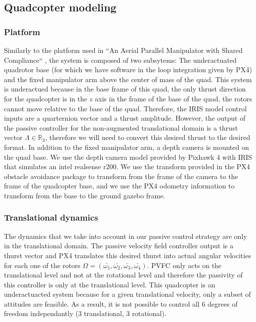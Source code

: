 \subsection{Quadcopter modeling}
\subsubsection{Platform}
Similarly to the platform used in ``An Aerial Parallel Manipulator with Shared Compliance`` \cite{Stephens2022}, the system is composed of two subsytems: The underactuated quadrotor base (for which we have software in the loop integration given by PX4) and the fixed manipulator arm above the center of mass of the quad.
This system is underactued because in the base frame of this quad, the only thrust direction for the quadcopter is in the $z$ axis in the frame of the base of the quad, the rotors cannot move relative to the base of the quad. Therefore, the IRIS model control inputs are a quarternion vector and a thrust amplitude. However, the output of the passive controller for the non-augmented translational domain is a thrust vector $\Lambda \in\mathbb R_3 $, therefore we will need to convert this desired thrust to the desired format.
In addition to the fixed manipulator arm, a depth camera is mounted on the quad base. We use the depth camera model provided by Pixhawk 4 with IRIS that simulates an intel realsense r200. We use the transform provided in the PX4 obstacle avoidance package to transform from the frame of the camera to the frame of the quadcopter base, and we use the PX4 odometry information to transform from the base to the ground gazebo frame.

\subsubsection{Translational dynamics}

The dynamics that we take into account in our passive control strategy are only in the translational domain. The passive velocity field controller output is a thurst vector and PX4 translates this desired thurst into actual angular velocities for each one of the rotors 
$\Omega = (\bar{\omega_1}, \bar{\omega_2}, \bar{\omega_3}, \bar{\omega_4})$. PVFC only acts on the translational level and not at the rotational level and therefore the passivity of this controller is only at the translational level. 
This quadcopter is an underactuacted system because for a given translational velocity, only a subset of attitudes are feasible. As a result, it is not possible to control all 6 degrees of freedom independantly (3 translational, 3 rotational).
 
